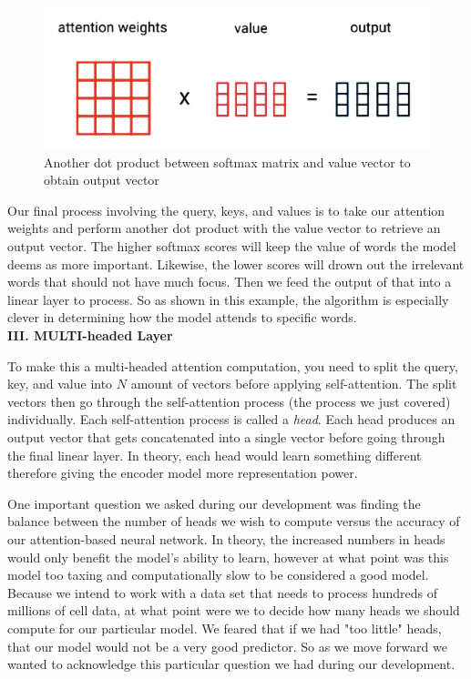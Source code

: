 \begin{figure}[H]
\centering
\includegraphics[width=.35\textwidth]{figures/t8.jpg}
\caption{Another dot product between softmax matrix and value vector to obtain output vector}
\end{figure}

Our final process involving the query, keys, and values is to take our attention weights and perform another dot product with the value vector to retrieve an output vector. The higher softmax scores will keep the value of words the model deems as more important. Likewise, the lower scores will drown out the irrelevant words that should not have much focus. Then we feed the output of that into a linear layer to process. So as shown in this example, the algorithm is especially clever in determining how the model attends to specific words. \\

\noindent
\textbf{III. MULTI-headed Layer}

To make this a multi-headed attention computation, you need to split the query, key, and value into $N$ amount of vectors before applying self-attention. The split vectors then go through the self-attention process (the process we just covered) individually. Each self-attention process is called a \emph{head}. Each head produces an output vector that gets concatenated into a single vector before going through the final linear layer. In theory, each head would learn something different therefore giving the encoder model more representation power.

One important question we asked during our development was finding the balance between the number of heads we wish to compute versus the accuracy of our attention-based neural network. In theory, the increased numbers in heads would only benefit the model's ability to learn, however at what point was this model too taxing and computationally slow to be considered a good model. Because we intend to work with a data set that needs to process hundreds of millions of cell data, at what point were we to decide how many heads we should compute for our particular model. We feared that if we had "too little" heads, that our model would not be a very good predictor. So as we move forward we wanted to acknowledge this particular question we had during our development. 

